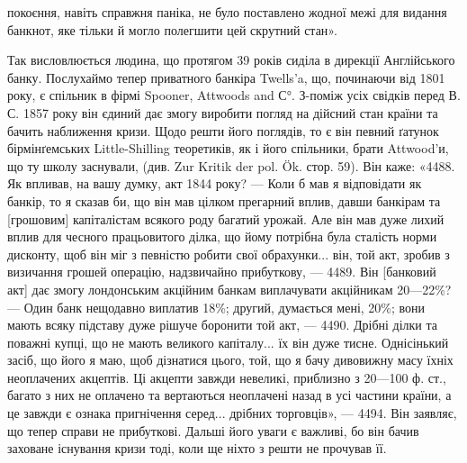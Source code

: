 покоєння, навіть справжня паніка, не було поставлено жодної межі для видання
банкнот, яке тільки й могло полегшити цей скрутний стан».

Так висловлюється людина, що протягом 39 років сиділа в дирекції Англійського
банку. Послухаймо тепер приватного банкіра Twells’a, що, починаючи
від 1801 року, є спільник в фірмі Spooner, Attwoods and С°. З-поміж усіх свідків
перед В. С. 1857 року він єдиний дає змогу виробити погляд на дійсний стан
країни та бачить наближення кризи. Щодо решти його поглядів, то є він певний
ґатунок бірмінґемських Little-Shilling теоретиків, як і його спільники, брати
Attwood’и, що ту школу заснували, (див. Zur Kritik der pol. Ök. стор. 59). Він
каже: «4488. Як впливав, на вашу думку, акт 1844 року? — Коли б мав я
відповідати як банкір, то я сказав би, що він мав цілком прегарний вплив,
давши банкірам та [грошовим] капіталістам всякого роду багатий урожай. Але
він мав дуже лихий вплив для чесного працьовитого ділка, що йому потрібна
була сталість норми дисконту, щоб він міг з певністю робити свої обрахунки...
він, той акт, зробив з визичання грошей операцію, надзвичайно прибуткову, —
4489. Він [банковий акт] дає змогу лондонським акційним банкам виплачувати
акційникам 20—22\%? — Один банк нещодавно виплатив 18\%; другий, думається
мені, 20\%; вони мають всяку підставу дуже рішуче боронити той акт, — 4490. Дрібні ділки та поважні
купці, що не мають великого капіталу... їх він
дуже тисне. Однісінький засіб, що його я маю, щоб дізнатися цього, той, що я
бачу дивовижну масу їхніх неоплачених акцептів. Ці акцепти завжди невеликі,
приблизно з 20—100 ф. ст., багато з них не оплачено та вертаються неоплачені
назад в усі частини країни, а це завжди є ознака пригнічення серед...
дрібних торговців», — 4494. Він заявляє, що тепер справи не прибуткові. Дальші
його уваги є важливі, бо він бачив заховане існування кризи тоді, коли ще
ніхто з решти не прочував її.

